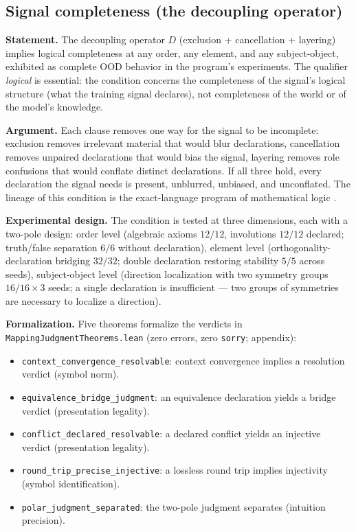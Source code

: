 \documentclass{article} %
\begin{document}
\subsection{Signal completeness (the decoupling operator)}

\textbf{Statement.} The decoupling operator $D$ (exclusion +
cancellation + layering) implies logical completeness at any order,
any element, and any subject-object, exhibited as complete OOD
behavior in the program's experiments. The qualifier
\emph{logical} is essential: the condition concerns the
completeness of the signal's logical structure (what the training
signal declares), not completeness of the world or of the model's
knowledge.

\textbf{Argument.} Each clause removes one way for the signal to be
incomplete: exclusion removes irrelevant material that would blur
declarations, cancellation removes unpaired declarations that would
bias the signal, layering removes role confusions that would
conflate distinct declarations. If all three hold, every
declaration the signal needs is present, unblurred, unbiased, and
unconflated. The lineage of this condition is the exact-language
program of mathematical logic \citep{frege1879begriffsschrift,
godel1930completeness, tarski1936truth, gentzen1935untersuchungen,
hilbert1928grundlagen}.

\textbf{Experimental design.} The condition is tested at three
dimensions, each with a two-pole design: order level (algebraic
axioms $12/12$, involutions $12/12$ declared; truth/false
separation $6/6$ without declaration), element level
(orthogonality-declaration bridging $32/32$; double declaration
restoring stability $5/5$ across seeds), subject-object level
(direction localization with two symmetry groups $16/16 \times 3$
seeds; a single declaration is insufficient --- two groups of
symmetries are necessary to localize a direction).

\textbf{Formalization.} Five theorems formalize the verdicts in
\texttt{MappingJudgmentTheorems.lean} (zero errors, zero
\texttt{sorry}; appendix):
\begin{itemize}
\item \texttt{context\_convergence\_resolvable}: context
convergence implies a resolution verdict (symbol norm).
\item \texttt{equivalence\_bridge\_judgment}: an equivalence
declaration yields a bridge verdict (presentation legality).
\item \texttt{conflict\_declared\_resolvable}: a declared
conflict yields an injective verdict (presentation legality).
\item \texttt{round\_trip\_precise\_injective}: a lossless round
trip implies injectivity (symbol identification).
\item \texttt{polar\_judgment\_separated}: the two-pole judgment
separates (intuition precision).
\end{itemize}
\end{document}
